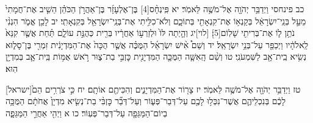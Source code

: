 \documentclass[twoside, openany, parskip=half, 11pt]{book}
\begin{document}
כב פינחסי וַיְדַבֵּ֥ר יְהֹוָ֖ה אֶל־מֹשֶׁ֥ה לֵּאמֹֽר׃ יא פִּֽינְחָ֨ס‏[4] בֶּן־אֶלְעָזָ֜ר בֶּן־אַהֲרֹ֣ן הַכֹּהֵ֗ן הֵשִׁ֤יב אֶת־חֲמָתִי֙ מֵעַ֣ל בְּנֵֽי־יִשְׂרָאֵ֔ל בְּקַנְא֥וֹ אֶת־קִנְאָתִ֖י בְּתוֹכָ֑ם וְלֹא־כִלִּ֥יתִי אֶת־בְּנֵֽי־יִשְׂרָאֵ֖ל בְּקִנְאָתִֽי׃ יב לָכֵ֖ן אֱמֹ֑ר הִנְנִ֨י נֹתֵ֥ן ל֛וֹ אֶת־בְּרִיתִ֖י שָׁלֽוֹם‏[5]׃ [לוי]יג וְהָ֤יְתָה לּוֹ֙ וּלְזַרְע֣וֹ אַחֲרָ֔יו בְּרִ֖ית כְּהֻנַּ֣ת עוֹלָ֑ם תַּ֗חַת אֲשֶׁ֤ר קִנֵּא֙ לֵֽאלֹהָ֔יו וַיְכַפֵּ֖ר עַל־בְּנֵ֥י יִשְׂרָאֵֽל׃ יד וְשֵׁם֩ אִ֨ישׁ יִשְׂרָאֵ֜ל הַמֻּכֶּ֗ה אֲשֶׁ֤ר הֻכָּה֙ אֶת־הַמִּדְיָנִ֔ית זִמְרִ֖י בֶּן־סָל֑וּא נְשִׂ֥יא בֵֽית־אָ֖ב לַשִּׁמְעֹנִֽי׃ טו וְשֵׁ֨ם הָֽאִשָּׁ֧ה הַמֻּכָּ֛ה הַמִּדְיָנִ֖ית כׇּזְבִּ֣י בַת־צ֑וּר רֹ֣אשׁ אֻמּ֥וֹת בֵּֽית־אָ֛ב בְּמִדְיָ֖ן הֽוּא׃

[ישראל]טז וַיְדַבֵּ֥ר יְהֹוָ֖ה אֶל־מֹשֶׁ֥ה לֵּאמֹֽר׃ יז צָר֖וֹר אֶת־הַמִּדְיָנִ֑ים וְהִכִּיתֶ֖ם אוֹתָֽם׃ יח כִּ֣י צֹרְרִ֥ים הֵם֙ לָכֶ֔ם בְּנִכְלֵיהֶ֛ם אֲשֶׁר־נִכְּל֥וּ לָכֶ֖ם עַל־דְּבַר־פְּע֑וֹר וְעַל־דְּבַ֞ר כׇּזְבִּ֨י בַת־נְשִׂ֤יא מִדְיָן֙ אֲחֹתָ֔ם הַמֻּכָּ֥ה בְיוֹם־הַמַּגֵּפָ֖ה עַל־דְּבַר־פְּעֽוֹר׃ כו א וַיְהִ֖י אַחֲרֵ֣י הַמַּגֵּפָ֑ה
\end{document}
